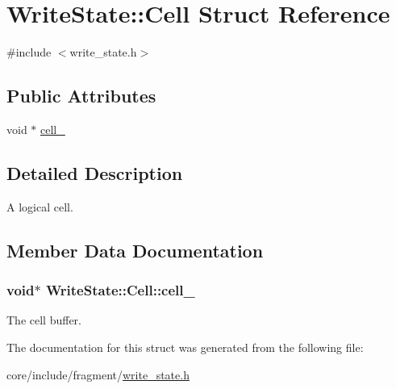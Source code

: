 \hypertarget{structWriteState_1_1Cell}{}\section{Write\+State\+:\+:Cell Struct Reference}
\label{structWriteState_1_1Cell}


{\ttfamily \#include $<$write\+\_\+state.\+h$>$}

\subsection*{Public Attributes}
\begin{DoxyCompactItemize}
\item 
void $\ast$ \hyperlink{structWriteState_1_1Cell_a5adee9d100a4b9b3b075230f9d8accd6}{cell\+\_\+}
\end{DoxyCompactItemize}


\subsection{Detailed Description}
A logical cell. 

\subsection{Member Data Documentation}
\hypertarget{structWriteState_1_1Cell_a5adee9d100a4b9b3b075230f9d8accd6}{}
\subsubsection[{cell\+\_\+}]{\setlength{\rightskip}{0pt plus 5cm}void$\ast$ Write\+State\+::\+Cell\+::cell\+\_\+}\label{structWriteState_1_1Cell_a5adee9d100a4b9b3b075230f9d8accd6}
The cell buffer. 

The documentation for this struct was generated from the following file\+:\begin{DoxyCompactItemize}
\item 
core/include/fragment/\hyperlink{write__state_8h}{write\+\_\+state.\+h}\end{DoxyCompactItemize}
